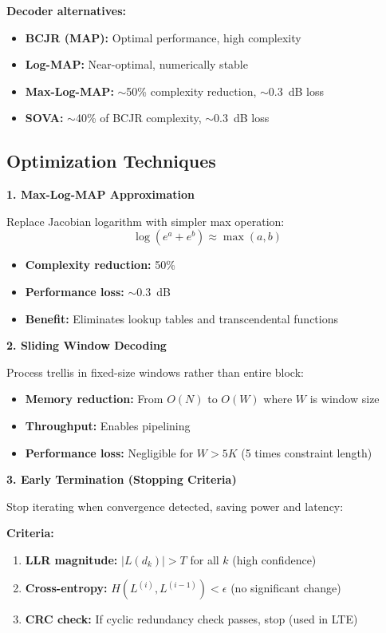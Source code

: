 \textbf{Decoder alternatives:}
\begin{itemize}
\item \textbf{BCJR (MAP):} Optimal performance, high complexity
\item \textbf{Log-MAP:} Near-optimal, numerically stable
\item \textbf{Max-Log-MAP:} $\sim$50\% complexity reduction, $\sim$0.3~dB loss
\item \textbf{SOVA:} $\sim$40\% of BCJR complexity, $\sim$0.3~dB loss
\end{itemize}

\subsection{Optimization Techniques}

\textbf{1. Max-Log-MAP Approximation}

Replace Jacobian logarithm with simpler max operation:
\begin{equation}
\log(e^a + e^b) \approx \max(a, b)
\end{equation}

\begin{itemize}
\item \textbf{Complexity reduction:} 50\%
\item \textbf{Performance loss:} $\sim$0.3~dB
\item \textbf{Benefit:} Eliminates lookup tables and transcendental functions
\end{itemize}

\textbf{2. Sliding Window Decoding}

Process trellis in fixed-size windows rather than entire block:
\begin{itemize}
\item \textbf{Memory reduction:} From $O(N)$ to $O(W)$ where $W$ is window size
\item \textbf{Throughput:} Enables pipelining
\item \textbf{Performance loss:} Negligible for $W > 5K$ (5 times constraint length)
\end{itemize}

\textbf{3. Early Termination (Stopping Criteria)}

Stop iterating when convergence detected, saving power and latency:

\textbf{Criteria:}
\begin{enumerate}
\item \textbf{LLR magnitude:} $|L(d_k)| > T$ for all $k$ (high confidence)
\item \textbf{Cross-entropy:} $H(L^{(i)}, L^{(i-1)}) < \epsilon$ (no significant change)
\item \textbf{CRC check:} If cyclic redundancy check passes, stop (used in LTE)
\end{enumerate}

